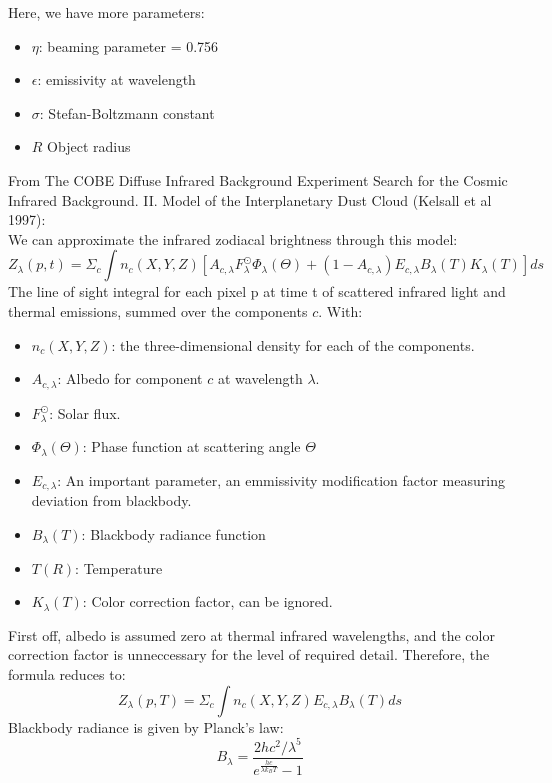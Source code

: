 \documentclass[a4paper,10pt]{article}
\begin{document}
Here, we have more parameters:
\begin{itemize}
 \item $\eta$: beaming parameter = 0.756
 \item $\epsilon$: emissivity at wavelength 
 \item $\sigma$: Stefan-Boltzmann constant
 \item $R$ Object radius
\end{itemize}
From The COBE Diffuse Infrared Background Experiment Search for the Cosmic Infrared Background. II. Model of the Interplanetary Dust Cloud (Kelsall et al 1997):\\
We can approximate the infrared zodiacal brightness through this model:
\begin{equation}
Z_{\lambda}(p, t) = \Sigma _c \int n_c(X, Y, Z)[A_{c, \lambda}F_{\lambda}^{\odot}\Phi_{\lambda}(\Theta) + (1-A_{c,\lambda})E_{c,\lambda}B_{\lambda}(T)K_{\lambda}(T)]ds
\end{equation}
The line of sight integral for each pixel p at time t of scattered infrared light and thermal emissions, summed over the components $c$. With:
\begin{itemize}
 \item $n_c(X, Y, Z)$: the three-dimensional density for each of the components.
 \item $A_{c,\lambda}$: Albedo for component $c$ at wavelength $\lambda$.
 \item $F_{\lambda}^{\odot}$: Solar flux.
 \item $\Phi_{\lambda}(\Theta)$: Phase function at scattering angle $\Theta$
 \item $E_{c, \lambda}$: An important parameter, an emmissivity modification factor measuring deviation from blackbody.
 \item $B_{\lambda}(T)$: Blackbody radiance function
 \item $T(R)$: Temperature
 \item $K_{\lambda}(T)$: Color correction factor, can be ignored.
\end{itemize}
First off, albedo is assumed zero at thermal infrared wavelengths, and the color correction factor is unneccessary for the level of required detail. Therefore, the formula reduces to:
\begin{equation}
 Z_{\lambda}(p, T) = \Sigma_c \int n_c(X, Y, Z)E_{c,\lambda}B_{\lambda}(T)ds
\end{equation}
Blackbody radiance is given by Planck's law:
\begin{equation}
 B_{\lambda} = \frac{2hc^2/\lambda^5}{e^{\frac{hc}{\lambda k_B T}} - 1}
\end{equation}
\end{document}
